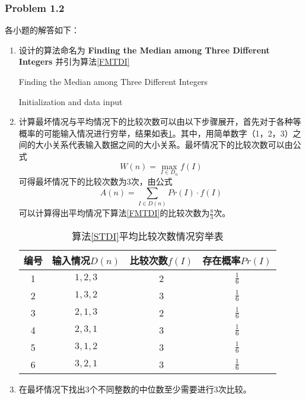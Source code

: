 \documentclass[UTF8,12pt]{article} %
\makeatletter
\theoremstyle{definition}
\newenvironment{proof}[1][\protect\proofname]{\par
\normalfont\topsep6\p@\@plus6\p@\relax
\trivlist
\itemindent\parindent
\item[\hskip\labelsep
\scshape
#1]\ignorespaces
}{%
\endtrivlist\@endpefalse
}
\renewcommand{\proofname}{\it{\textbf{证明}}}
\makeatother
\begin{document}
\subsubsection*{Problem 1.2}
\begin{proof}[\textbf{解答}]
各小题的解答如下：

\begin{enumerate}[1)]
	\item 设计的算法命名为 \textbf{Finding the Median among Three Different Integers} 并引为算法\ref{FMTDI}

		\begin{algorithm}[htb]
	    \caption{Finding the Median among Three Different Integers}
	    \label{FMTDI}

		\SetAlgoLined
		Initialization and data input\;
		\end{algorithm}

\item 计算最坏情况与平均情况下的比较次数可以由以下步骤展开，首先对于各种等概率的可能输入情况进行穷举，结果如表\ref{tab2}。其中，用简单数字（1，2，3）之间的大小关系代表输入数据之间的大小关系。最坏情况下的比较次数可以由公式\[W(n) = \max_{I \in D_{n}}f(I)\] 可得最坏情况下的比较次数为3次，由公式\[A(n) = \sum_{I \in D(n)}Pr(I)\cdot f(I)\]可以计算得出平均情况下算法\ref{FMTDI}的比较次数为$\displaystyle\frac{8}{3}$次。

\begin{table}[!htbp]
	\caption{算法\ref{STDI}平均比较次数情况穷举表} \centering
	\label{tab2}
	\begin{tabular}{cccc}
	\toprule[1.5pt]
	编号& 输入情况$D(n)$ & 比较次数$f(I)$ & 存在概率$Pr(I)$\\
	\midrule[1pt]
	1 & $1,2,3$ & 2 & $\displaystyle\frac{1}{6}$\\
	2 & $1,3,2$ & 3 & $\displaystyle\frac{1}{6}$\\
	3 & $2,1,3$ & 2 & $\displaystyle\frac{1}{6}$\\
	4 & $2,3,1$ & 3 & $\displaystyle\frac{1}{6}$\\
	5 & $3,1,2$ & 3 & $\displaystyle\frac{1}{6}$\\
	6 & $3,2,1$ & 3 & $\displaystyle \frac{1}{6}$\\
	\bottomrule[1.5pt]
	\end{tabular}
	\end{table}

\item 在最坏情况下找出3个不同整数的中位数至少需要进行3次比较。
\end{enumerate}
\end{proof}
\end{document}
